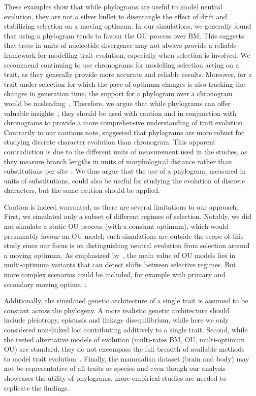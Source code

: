 \documentclass{article}
\begin{document}
These examples show that while phylograms are useful to model neutral evolution, they are not a silver bullet to disentangle the effect of drift and stabilizing selection on a moving optimum.
In our simulations, we generally found that using a phylogram tends to favour the OU process over BM.
This suggests that trees in units of nucleotide divergence may not always provide a reliable framework for modelling trait evolution, especially when selection is involved.
We recommend continuing to use chronograms for modelling selection acting on a trait, as they generally provide more accurate and reliable results.
Moreover, for a trait under selection for which the pace of optimum changes is also tracking the changes in generation time, the support for a phylogram over a chronogram would be misleading~\citep{litsios_effects_2012}.
Therefore, we argue that while phylograms can offer valuable insights~\citep{wilson_chronogram_2022}, they should be used with caution and in conjunction with chronograms to provide a more comprehensive understanding of trait evolution.
Contrarily to our cautious note, \citet{wilson_chronogram_2022} suggested that phylograms are more robust for studying discrete character evolution than chronogram.
This apparent contradiction is due to the different units of measurement used in the studies, as they measure branch lengths in units of morphological distance rather than substitutions per site~\citep{wilson_chronogram_2022}.
We thus argue that the use of a phylogram, measured in units of substitutions, could also be useful for studying the evolution of discrete characters, but the same caution should be applied.

Caution is indeed warranted, as there are several limitations to our approach.
First, we simulated only a subset of different regimes of selection.
Notably, we did not simulate a static OU process (with a constant optimum), which would presumably favour an OU model; such simulations are outside the scope of this study since our focus is on distinguishing neutral evolution from selection around a moving optimum.
As emphasized by~\citet{grabowski_cautionary_2023}, the main value of OU models lies in multi-optimum variants that can detect shifts between selective regimes.
But more complex scenarios could be included, for example with primary and secondary moving optima~\citep{hansen_three_2024}.

Additionally, the simulated genetic architecture of a single trait is assumed to be constant across the phylogeny.
A more realistic genetic architecture should include pleiotropy, epistasis and linkage disequilibrium, while here we only considered non-linked loci contributing additively to a single trait.
Second, while the tested alternative models of evolution (multi-rates BM, OU, multi-optimum OU) are standard, they do not encompass the full breadth of available methods to model trait evolution~\citep{pennell_geiger_2014, hohna_revbayes_2016}.
Finally, the mammalian dataset (brain and body) may not be representative of all traits or species and even though our analysis showcases the utility of phylograms, more empirical studies are needed to replicate the findings.
\end{document}
